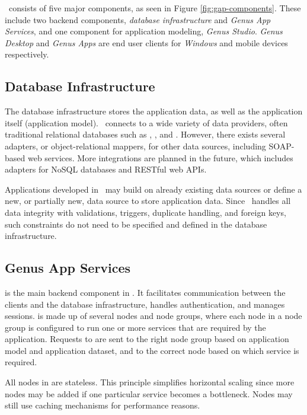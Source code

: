 \gap~consists of five major components, as seen in Figure \ref{fig:gap-components}. These include two backend components, \textit{database infrastructure} and \textit{Genus App Services}, and one component for application modeling, \textit{Genus Studio}. \textit{Genus Desktop} and \textit{Genus Apps} are end user clients for \textit{Windows} and mobile devices respectively.

\subsection{Database Infrastructure}
\label{sub:Database Infrastructure}
The database infrastructure stores the application data, as well as the application itself (application model). \gap~connects to a wide variety of data providers, often traditional relational databases such as , , and . However, there exists several adapters, or object-relational mappers, for other data sources, including SOAP-based web services. More integrations are planned in the future, which includes adapters for NoSQL databases and RESTful web APIs. 

Applications developed in \gap~may build on already existing data sources or define a new, or partially new, data source to store application data. Since \gap~handles all data integrity with validations, triggers, duplicate handling, and foreign keys, such constraints do not need to be specified and defined in the database infrastructure.


\subsection{Genus App Services}
\label{sub:Genus App Services}
 is the main backend component in \gap. It facilitates communication between the clients and the database infrastructure, handles authentication, and manages sessions.  is made up of several nodes and node groups, where each node in a node group is configured to run one or more services that are required by the application. Requests to  are sent to the right node group based on application model and application dataset, and to the correct node based on which service is required. 

All nodes in  are stateless. This principle simplifies horizontal scaling since more nodes may be added if one particular service becomes a bottleneck. Nodes may still use caching mechanisms for performance reasons.

